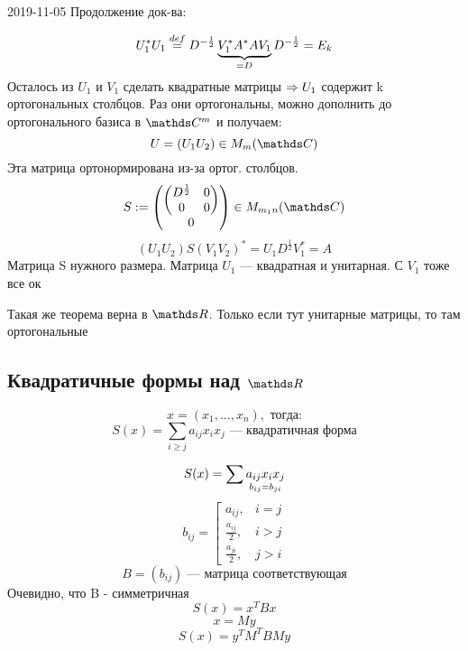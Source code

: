 \documentclass[main]{subfiles}
\begin{document}
  \begin{lect}{2019-11-05}
    Продолжение док-ва:
    \begin{Proof}
      \[U_1^* U_1 \os{def}{=} D^{-\frac{1}{2}} \ub{=D}{V_1^* A^* A V_1} D^{-\frac{1}{2}} = E_k\]
      Осталось из $U_1$ и $V_1$ сделать квадратные матрицы $\Ra U_1$ содержит k ортогональных столбцов. Раз они ортогональны, можно дополнить до ортогонального базиса в $\CC^m$ и получаем:
      \[U=(U_1 U_2) \in M_m(\CC)\]
      Эта матрица ортонормирована из-за ортог. столбцов.
      \[S:=\begin{pmatrix}
      \begin{pmatrix}
        D^{\frac{1}{2}} & 0\\
        0 & 0
      \end{pmatrix}\\
      0
      \end{pmatrix} \in M_{m_1 n}(\CC)\]
      \[(U_1 U_2) S (V_1 V_2)^* = U_1 D^{\frac{1}{2}} V_1^* = A\]
      Матрица S нужного размера. Матрица $U_1$ --- квадратная и унитарная. С $V_1$ тоже все ок
    \end{Proof}

    \begin{remark}
      Такая же теорема верна в $\R$. Только если тут унитарные матрицы, то там ортогональные
    \end{remark}

    \subsection{Квадратичные формы над $\R$}
    \begin{Definition}
      \[x=(x_1,...,x_n),\text{ тогда:}\]
      \[S(x) = \sum_{i \geq j} a_{ij} x_i x_j \text{ --- квадратичная форма}\]
    \end{Definition}

    \begin{Remark}
      \[S(x) = \sum \us{b_{ij} = b_{ji}}{a_{ij} x_i x_j}\]
      \[b_{ij} = \left[\begin{matrix}
        a_{ij}, & i=j\\
        \frac{a_{ij}}{2}, & i > j\\
        \frac{a_{ji}}{2}, & j>i
      \end{matrix}\right.\]
      \[B=(b_{ij}) \text{ --- матрица соответствующая}\]
      Очевидно, что B - симметричная
      \[S(x) = x^T B x\]
      \[x = My\]
      \[S(x) = y^T M^T B My\]
    \end{Remark}


\end{lect}
\end{document}
